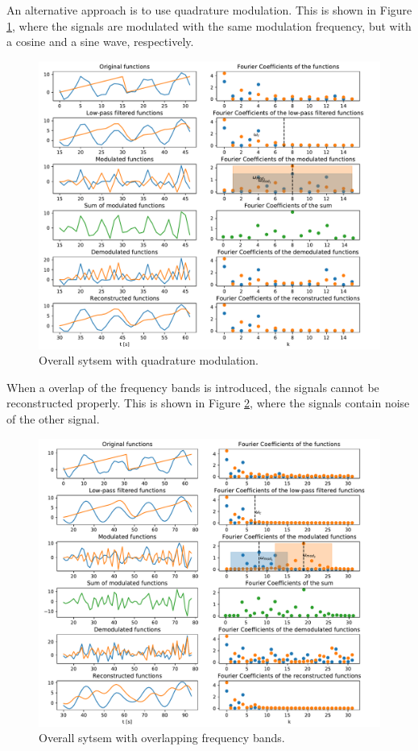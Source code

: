 \documentclass[12pt, a4paper]{report}
\begin{document}
An alternative approach is to use quadrature modulation.
This is shown in Figure \ref{fig:quadrature},
where the signals are modulated with the same modulation frequency,
but with a cosine and a sine wave, respectively.
\begin{figure}[h!]
	\centering
	\includegraphics[width=\textwidth]{figures/overall_quad.pdf}
	\caption{Overall sytsem with quadrature modulation.}
	\label{fig:quadrature}
\end{figure}

When a overlap of the frequency bands is introduced,
the signals cannot be reconstructed properly.
This is shown in Figure \ref{fig:overlap},
where the signals contain noise of the other signal.
\begin{figure}[h!]
	\centering
	\includegraphics[width=\textwidth]{figures/overall_overlapping.pdf}
	\caption{Overall sytsem with overlapping frequency bands.}
	\label{fig:overlap}
\end{figure}
\end{document}
